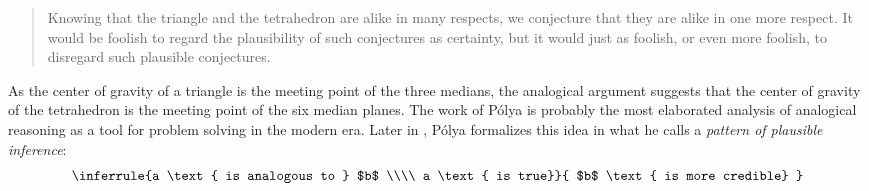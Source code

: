 \begin{quote}
Knowing that the triangle and the tetrahedron are alike in many respects, we
  conjecture that they are alike in one more respect. It would be foolish to
  regard the plausibility of such conjectures as certainty, but it would just
  as foolish, or even more foolish, to disregard such plausible conjectures.
\end{quote}

As the center of gravity of a triangle is the meeting point of the three
medians, the analogical argument suggests that the center of gravity of the
tetrahedron is the meeting point of the six median planes. The work of P\'olya
is probably the most elaborated analysis of analogical reasoning as a tool for
problem solving in the modern era. Later in \cite{Pol54}, P\'olya formalizes
this idea in what he calls a \textit{pattern of plausible inference}:
$$
\inferrule{a \text{ is analogous to } $b$ \\\\ a \text{ is true}}{ $b$ \text{
  is more credible} }
$$


